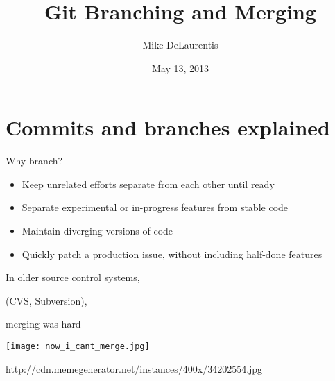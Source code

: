 \documentclass{beamer}
\title{Git Branching and Merging}
\author{Mike DeLaurentis}
\date{May 13, 2013}
\date{}
\begin{document}
\begin{frame}[plain]
\titlepage
\end{frame}

\begin{frame}[plain]
\begin{huge}

\tableofcontents

\end{huge}
\end{frame}

\section{Commits and branches explained}

\begin{frame}[plain]
\begin{huge}
Why branch?
\end{huge}
\end{frame}

\begin{frame}[plain]
\begin{LARGE}
\begin{itemize}
\item Keep unrelated efforts separate from each other until ready
\item Separate experimental or in-progress features from stable code
\item Maintain diverging versions of code
\item Quickly patch a production issue, without including half-done features
\end{itemize}
\end{LARGE}
\end{frame}


\begin{frame}[plain]
\begin{center}
\begin{Large}
 In older source control systems,

\vspace{0.2in}

 (CVS, Subversion),

\vspace{0.2in}

 merging was hard
\end{Large}
\end{center}

\end{frame}

\begin{frame}[plain]
  \begin{center}
    \texttt{[image: now\_i\_cant\_merge.jpg]}

    \begin{scriptsize}
      http://cdn.memegenerator.net/instances/400x/34202554.jpg
    \end{scriptsize}
  \end{center}
\end{frame}
\end{document}
